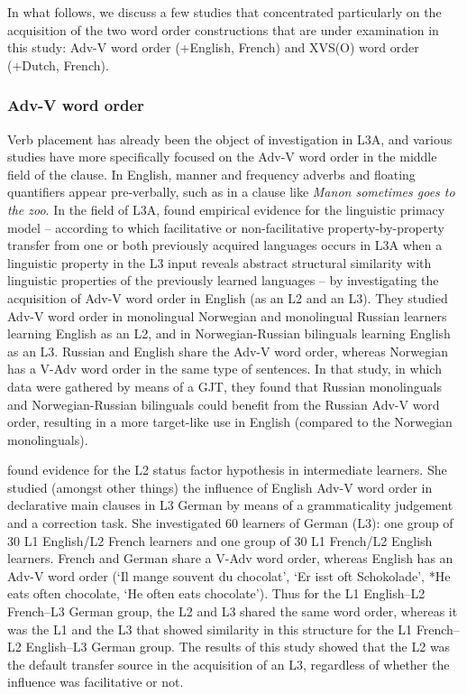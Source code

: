 \documentclass[output=paper]{langsci/langscibook}
\begin{document}
In what follows, we discuss a few studies that concentrated particularly on the acquisition of the two word order constructions that are under examination in this study: Adv-V word order (+English, \textminus French) and XVS(O) word order (+Dutch, \textminus French).

\subsubsection{{Adv-V word order}}%
\label{sec:stadt:2.2.1}

Verb placement has already been the object of investigation in L3A, and various studies have more specifically focused on the Adv-V word order in the middle field of the clause. In English, manner and frequency adverbs and floating quantifiers appear pre-verbally, such as in a clause like \textit{Manon sometimes goes to the zoo}. In the field of L3A, \citet{WestergaardEtAl2016} found empirical evidence for the linguistic primacy model – according to which facilitative or non-facilitative property-by-property transfer from one or both previously acquired languages occurs in L3A when a linguistic property in the L3 input reveals abstract structural similarity with linguistic properties of the previously learned languages – by investigating the acquisition of Adv-V word order in English (as an L2 and an L3). They studied Adv-V word order in monolingual Norwegian and monolingual Russian learners learning English as an L2, and in Norwegian-Russian bilinguals learning English as an L3. Russian and English share the Adv-V word order, whereas Norwegian has a V-Adv word order in the same type of sentences. In that study, in which data were gathered by means of a GJT, they found that Russian monolinguals and Norwegian-Russian bilinguals could benefit from the Russian Adv-V word order, resulting in a more target-like use in English (compared to the Norwegian monolinguals).

\citet{Falk2010} found evidence for the L2 status factor hypothesis in intermediate learners. She studied (amongst other things) the influence of English Adv-V word order in declarative main clauses in L3 German by means of a grammaticality judgement and a correction task. She investigated 60 learners of German (L3): one group of 30 L1 English/L2 French learners and one group of 30 L1 French/L2 English learners. French and German share a V-Adv word order, whereas English has an Adv-V word order (‘Il mange souvent du chocolat’, ‘Er isst oft Schokolade’, *He eats often chocolate, ‘He often eats chocolate’). Thus for the L1 English–L2 French–L3 German group, the L2 and L3 shared the same word order, whereas it was the L1 and the L3 that showed similarity in this structure for the L1 French–L2 English–L3 German group. The results of this study showed that the L2 was the default transfer source in the acquisition of an L3, regardless of whether the influence was facilitative or not.
\end{document}
